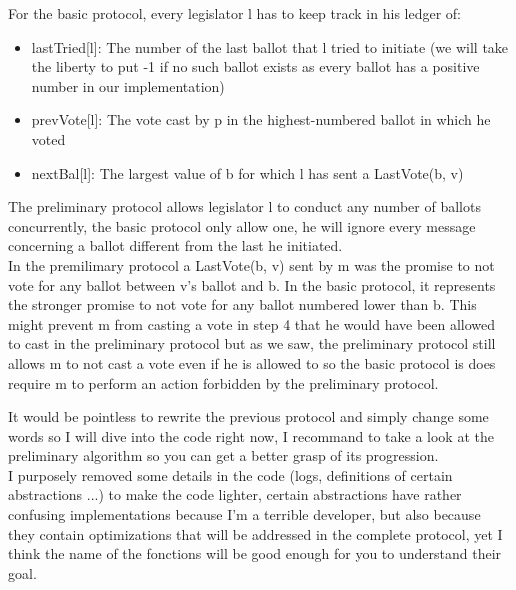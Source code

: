 \documentclass{article}
\begin{document}
For the basic protocol, every legislator l has to keep track in his ledger of:

\begin{itemize}
    \item lastTried[l]: The number of the last ballot that l tried to initiate (we will take the liberty to put -1 if no such ballot exists as every ballot has a positive number in our implementation)
    \item prevVote[l]: The vote cast by p in the highest-numbered ballot in which he voted
    \item nextBal[l]: The largest value of b for which l has sent a LastVote(b, v)
\end{itemize}

The preliminary protocol allows legislator l to conduct any number of ballots concurrently, the basic protocol only allow one, he will ignore every message concerning a ballot different from the last he initiated.\\
In the premilimary protocol a LastVote(b, v) sent by m was the promise to not vote for any ballot between v's ballot and b. In the basic protocol, it represents the stronger promise to not vote for any ballot numbered lower than b. This might prevent m from casting a vote in step 4 that he would have been allowed to cast in the preliminary protocol but as we saw, the preliminary protocol still allows m to not cast a vote even if he is allowed to so the basic protocol is does require m to perform an action forbidden by the preliminary protocol.

It would be pointless to rewrite the previous protocol and simply change some words so I will dive into the code right now, I recommand to take a look at the preliminary algorithm so you can get a better grasp of its progression.\\
I purposely removed some details in the code (logs, definitions of certain abstractions ...) to make the code lighter, certain abstractions have rather confusing implementations because I'm a terrible developer, but also because they contain optimizations that will be addressed in the complete protocol, yet I think the name of the fonctions will be good enough for you to understand their goal.
\end{document}
